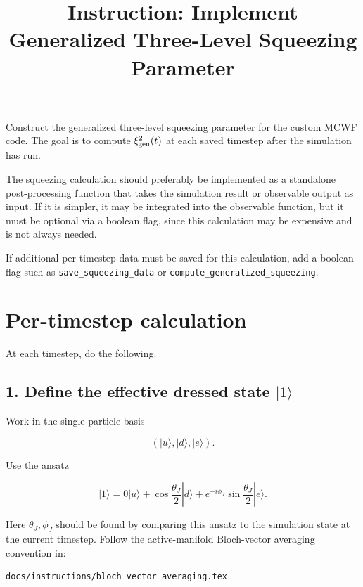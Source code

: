 \documentclass[11pt]{article}
\title{Instruction: Implement Generalized Three-Level Squeezing Parameter}
\author{}
\date{}
\begin{document}
\maketitle

Construct the generalized three-level squeezing parameter for the custom MCWF
code. The goal is to compute \(\xi^2_{\rm gen}(t)\) at each saved timestep after
the simulation has run.

The squeezing calculation should preferably be implemented as a standalone
post-processing function that takes the simulation result or observable output as
input. If it is simpler, it may be integrated into the observable function, but
it must be optional via a boolean flag, since this calculation may be expensive
and is not always needed.

If additional per-timestep data must be saved for this calculation, add a
boolean flag such as \texttt{save\_squeezing\_data} or
\texttt{compute\_generalized\_squeezing}.

\section*{Per-timestep calculation}

At each timestep, do the following.

\subsection*{1. Define the effective dressed state \(|1\rangle\)}

Work in the single-particle basis

\begin{equation}
(|u\rangle, |d\rangle, |e\rangle).
\end{equation}

Use the ansatz

\begin{equation}
|1\rangle =
0|u\rangle
+
\cos\frac{\theta_J}{2}|d\rangle
+
e^{-i\phi_J}\sin\frac{\theta_J}{2}|e\rangle.
\end{equation}

Here \(\theta_J,\phi_J\) should be found by comparing this ansatz to the
simulation state at the current timestep. Follow the active-manifold
Bloch-vector averaging convention in:

\begin{verbatim}
docs/instructions/bloch_vector_averaging.tex
\end{verbatim}
\end{document}
